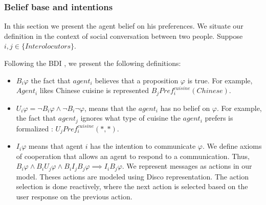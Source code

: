 \documentclass{llncs}
\begin{document}
\subsubsection{Belief base and intentions}
In this section we present the agent belief on his preferences. We situate our definition in the context of social conversation between two people. Suppose $i,j \in \{Interolocutors\}$.
\par Following the BDI \cite{rao1991modeling}, we present the following definitions:
\begin{itemize}
	\item  $ B_{i} \varphi$ the fact that $agent_{i}$  believes that a proposition $\varphi$ is true. For example, $Agent_{i}$ likes Chinese cuisine is represented $ B_{j} Pref_{i}^{cuisine}(Chinese)$.
	\item  $U_{i} \varphi = \neg B_{i} \varphi \land \neg B_{i} \neg \varphi$, means that the $agent_{i}$ has no belief on $\varphi$.  For example, the fact that $agent_{j}$ ignores what type of cuisine the $agent_{i}$ prefers is formalized : $U_{j} Pref_{i}^{cuisine}(*,*)$.
	\item $I_{i} \varphi$ means that  agent $i$ has the intention to communicate $\varphi$. We define axioms of cooperation that allows an agent to respond to a communication. Thus, $ B_{i} \varphi \land  B_{i} U_{j} \varphi \land  B_{i} I_{j}  B_{j} \varphi \implies I_{i}  B_{j} \varphi  $.  We represent messages as actions in our model. Theses actions are modeled using Disco \cite{rich2009building} representation.  The action selection is done reactively, where the next action is selected based on the user response on the previous action. 
	
\end{itemize}
\end{document}
